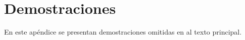 \chapter{Demostraciones}\label{appC}

En este ap\'endice se presentan demostraciones omitidas en al texto principal.
